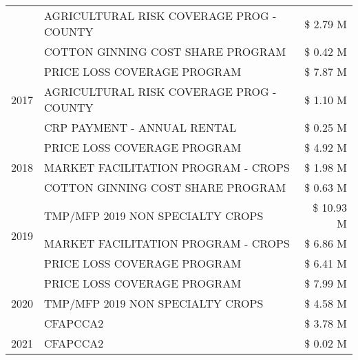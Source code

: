 \begin{tabular}{llr}
 & AGRICULTURAL RISK COVERAGE PROG - COUNTY & \$ 2.79 M \\
 & COTTON GINNING COST SHARE PROGRAM & \$ 0.42 M \\
\cline{1-3}
\multirow[t]{3}{*}{2017} & PRICE LOSS COVERAGE PROGRAM & \$ 7.87 M \\
 & AGRICULTURAL RISK COVERAGE PROG - COUNTY & \$ 1.10 M \\
 & CRP PAYMENT - ANNUAL RENTAL & \$ 0.25 M \\
\cline{1-3}
\multirow[t]{3}{*}{2018} & PRICE LOSS COVERAGE PROGRAM & \$ 4.92 M \\
 & MARKET FACILITATION PROGRAM - CROPS & \$ 1.98 M \\
 & COTTON GINNING COST SHARE PROGRAM & \$ 0.63 M \\
\cline{1-3}
\multirow[t]{3}{*}{2019} & TMP/MFP 2019 NON SPECIALTY CROPS & \$ 10.93 M \\
 & MARKET FACILITATION PROGRAM - CROPS & \$ 6.86 M \\
 & PRICE LOSS COVERAGE PROGRAM & \$ 6.41 M \\
\cline{1-3}
\multirow[t]{3}{*}{2020} & PRICE LOSS COVERAGE PROGRAM & \$ 7.99 M \\
 & TMP/MFP 2019 NON SPECIALTY CROPS & \$ 4.58 M \\
 & CFAPCCA2 & \$ 3.78 M \\
\cline{1-3}
2021 & CFAPCCA2 & \$ 0.02 M \\
\cline{1-3}
\bottomrule
\end{tabular}
